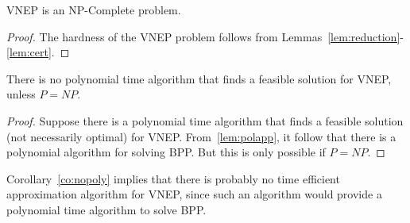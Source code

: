 \begin{theorem} \label{th:npcomplete}
  VNEP is an NP-Complete problem.
\end{theorem}

\begin{proof}
The hardness of the VNEP problem follows from Lemmas~\ref{lem:reduction}-\ref{lem:cert}. 
\end{proof}

\begin{corollary} \label{co:nopoly}
  There is no polynomial time algorithm that finds a feasible solution for VNEP, unless $P=NP$.
\end{corollary}

\begin{proof}
  Suppose there is a polynomial time algorithm that finds a feasible solution (not necessarily optimal) for VNEP. From~\ref{lem:polapp}, it follow that there is a polynomial algorithm for solving BPP\@. 
  But this is only possible if $P = NP$.
\end{proof}

Corollary~\ref{co:nopoly} implies that there is probably no time efficient approximation algorithm for VNEP, since such an algorithm would provide a polynomial time algorithm to solve BPP.
